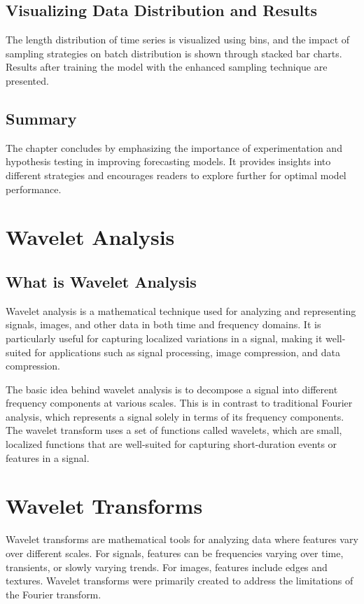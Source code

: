 \documentclass{article}
\begin{document}
\subsection{Visualizing Data Distribution and Results}
The length distribution of time series is visualized using bins, and the impact of sampling strategies on batch distribution is shown through stacked bar charts. Results after training the model with the enhanced sampling technique are presented.

\subsection{Summary}
The chapter concludes by emphasizing the importance of experimentation and hypothesis testing in improving forecasting models. It provides insights into different strategies and encourages readers to explore further for optimal model performance.

\section{Wavelet Analysis}
\subsection{What is Wavelet Analysis} 
Wavelet analysis is a mathematical technique used for analyzing and representing signals, images, and other data in both time and frequency domains. It is particularly useful for capturing localized variations in a signal, making it well-suited for applications such as signal processing, image compression, and data compression.

The basic idea behind wavelet analysis is to decompose a signal into different frequency components at various scales. This is in contrast to traditional Fourier analysis, which represents a signal solely in terms of its frequency components. The wavelet transform uses a set of functions called wavelets, which are small, localized functions that are well-suited for capturing short-duration events or features in a signal.

\section{Wavelet Transforms}
Wavelet transforms are mathematical tools for analyzing data where features vary over different scales. For signals, features can be frequencies varying over time, transients, or slowly varying trends. For images, features include edges and textures. Wavelet transforms were primarily created to address the limitations of the Fourier transform.
\end{document}

